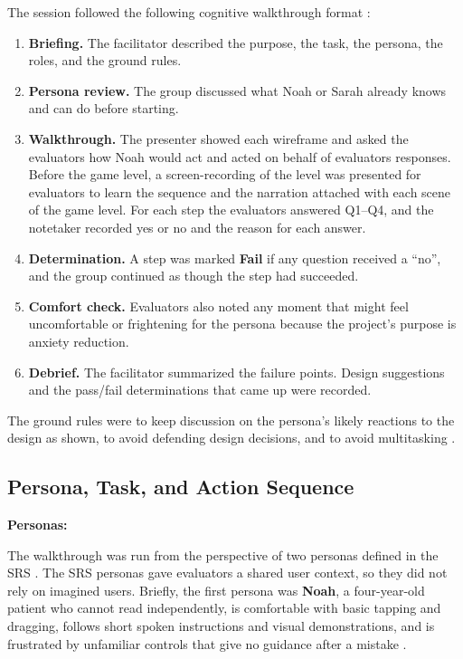 \documentclass{article}
\newcommand{\fail}{{\textbf{Fail}}}
\begin{document}
The session followed the following cognitive walkthrough format \cite{nng-workshop}:
\begin{enumerate}
  \item \textbf{Briefing.} The facilitator described the purpose, the task, the persona, the roles, 
  and the ground rules.
  \item \textbf{Persona review.} The group discussed what Noah or Sarah already knows and can do 
  before starting.
  \item \textbf{Walkthrough.} The presenter showed each wireframe and asked the evaluators how 
  Noah would act and acted on behalf of evaluators responses. Before the game level, a screen-recording 
  of the level was presented for evaluators to learn the sequence and the narration attached with each 
  scene of the game level. For each step the evaluators answered 
  Q1--Q4, and the notetaker recorded yes or no and the reason for each answer.
  \item \textbf{Determination.} A step was marked \fail{} if any question received a ``no'', and 
  the group continued as though the step had succeeded.
  \item \textbf{Comfort check.} Evaluators also noted any moment that might feel uncomfortable or 
  frightening for the persona because the project's purpose is anxiety reduction.
  \item \textbf{Debrief.} The facilitator summarized the failure points. Design suggestions and 
  the pass/fail determinations that came up were recorded.

\end{enumerate}
The ground rules were to keep discussion on the persona's likely reactions to the design as shown, 
to avoid defending design decisions, and to avoid multitasking \cite{nng-workshop}.

\subsection{Persona, Task, and Action Sequence}

\textbf{Personas:}

The walkthrough was run from the perspective of two personas defined in the SRS \cite{SRS}. 
The SRS personas gave evaluators a shared user context, so they did not rely on imagined users. 
Briefly, the first persona was \textbf{Noah}, a four-year-old 
patient who cannot read independently, is comfortable with basic tapping and dragging, follows short 
spoken instructions and visual demonstrations, and is frustrated by unfamiliar controls that give no 
guidance after a mistake \cite{SRS}. 
\end{document}

